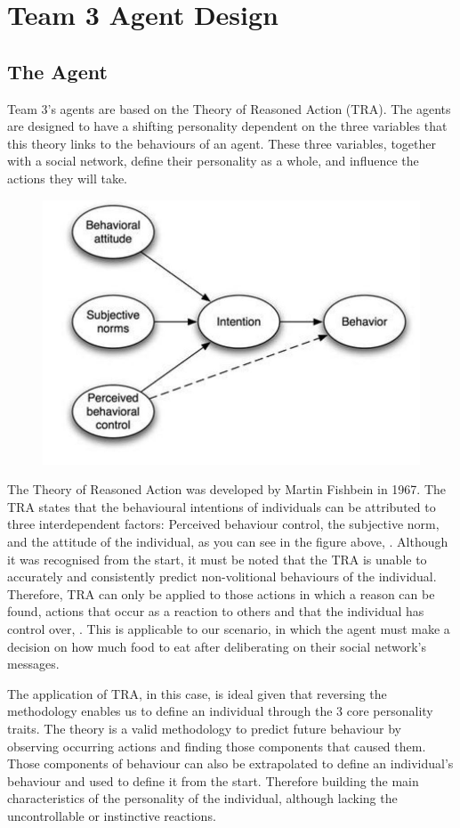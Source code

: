 \chapter{Team 3 Agent Design}\label{team_3_agent_design}

\section{The Agent}\label{sec:the_agent}
Team 3’s agents are based on the Theory of Reasoned Action (TRA). The agents are designed to have a shifting personality dependent on the three variables that this theory links to the behaviours of an agent. These three variables, together with a social network, define their personality as a whole, \cite{victor} and influence the actions they will take.\par
\begin{figure}[htb]
    \centering
    \includegraphics[width=0.5\linewidth]{005_team_3_agent_design/images/image1.jpg}
    \label{fig:TRA-diagram}
\end{figure}
The Theory of Reasoned Action was developed by Martin Fishbein in 1967. The TRA states that the behavioural intentions of individuals can be attributed to three interdependent factors: Perceived behaviour control, the subjective norm, and the attitude of the individual, as you can see in the figure above, \cite{norazalan}. Although it was recognised from the start, it must be noted that the TRA is unable to accurately and consistently predict non-volitional behaviours of the individual. Therefore, TRA can only be applied to those actions in which a reason can be found, actions that occur as a reaction to others and that the individual has control over, \cite{TRA}. This is applicable to our scenario, in which the agent must make a decision on how much food to eat after deliberating on their social network’s messages. \par
The application of TRA, in this case, is ideal given that reversing the methodology enables us to define an individual through the 3 core personality traits. The theory is a valid methodology to predict future behaviour by observing occurring actions and finding those components that caused them. Those components of behaviour can also be extrapolated to define an individual's behaviour and used to define it from the start. Therefore building the main characteristics of the personality of the individual, although lacking the uncontrollable or instinctive reactions. \par
